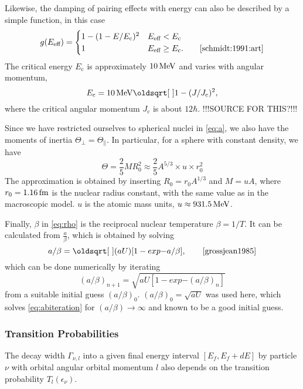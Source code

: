 Likewise, the damping of pairing effects with energy can also be described by a simple function, in this case
\begin{equation}
g(E_\text{eff}) = \begin{cases} 1-(1-E/E_\text{c})^2 & E_\text{eff} < E_\text{c} \\
 1 & E_\text{eff} \ge E_\text{c}.\qquad\cite{schmidt:1991:art}
\end{cases}
\end{equation}
The critical energy $E_\text{c}$ is approximately $\unit[10]{MeV}$ and varies with angular momentum, 
\begin{equation}
E_\text{c} = \unit[10]{MeV}\sqrt{1-(J/J_\text{c})^2},
\end{equation}
where the critical angular momentum $J_\text{c}$ is about $12\hbar$. !!!SOURCE FOR THIS?!!!

Since we have restricted ourselves to spherical nuclei in \eqref{eq:a}, we also have the moments of inertia $\Theta_\perp = \Theta_\parallel$. In particular, for a sphere with constant density, we have
\begin{equation}
\Theta = \frac{2}{5} M R_0^2 \approx \frac{2}{5} A^{5/3}\times u \times r_0^2
\end{equation}
The approximation is obtained by inserting $R_0 = r_0 A^{1/3}$ and $M=u A$, where $r_0=\unit[1.16]{fm}$ is the nuclear radius constant, with the same value as in the macroscopic model\cite{moller1995}. $u$ is the atomic mass units, $u \approx \unit[931.5]{MeV}$.

Finally, $\beta$ in \eqref{eq:rho} is the reciprocal nuclear temperature $\beta=1/T$. It can be calculated from $\tfrac{a}{\beta}$, which is obtained by solving
\begin{equation}
a/\beta=\sqrt{(aU)[1 -exp{-a/\beta}]},\qquad\cite{grossjean1985}\label{eq:abiteration}
\end{equation}
which can be done numerically by iterating
\begin{equation}
(a/\beta)_{n+1}=\sqrt{aU[1 -exp{-(a/\beta)_n}]}
\end{equation}
from a suitable initial guess $(a/\beta)_{0}$. $(a/\beta)_{0}=\sqrt{aU}$ was used here, which solves \eqref{eq:abiteration} for $(a/\beta) \to \infty$ and known to be a good initial guess\cite{grossjean1985}.

\subsubsection{Transition Probabilities}
The decay width $\Gamma_{\nu,l}$ into a given final energy interval $[E_f,E_f+dE]$ by particle $\nu$ with orbital angular orbital momentum $l$ also depends on the transition probability $T_l(\epsilon_\nu)$.

